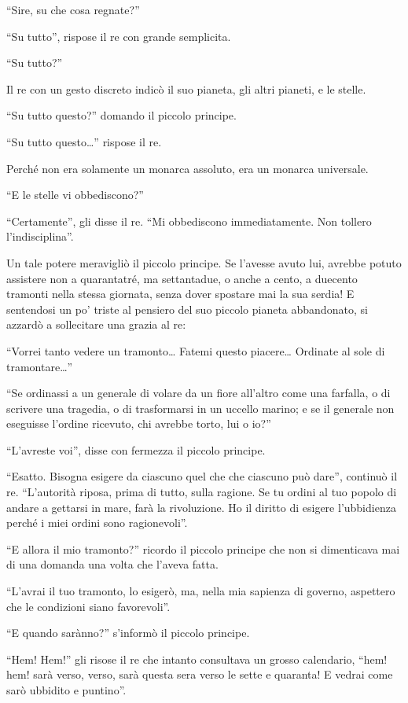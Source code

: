 \documentclass[11pt]{scrbook}
\begin{document}
``Sire, su che cosa regnate?''

``Su tutto'', rispose il re con grande semplicita.

``Su tutto?''

Il re con un gesto discreto indicò il suo pianeta, gli altri pianeti, e le stelle.

``Su tutto questo?'' domando il piccolo principe.

``Su tutto questo\ldots{}'' rispose il re.

Perché non era solamente un monarca assoluto, era un monarca universale.

``E le stelle vi obbediscono?''

``Certamente'', gli disse il re. ``Mi obbediscono immediatamente. Non tollero l'indisciplina''.

Un tale potere meravigliò il piccolo principe. Se l'avesse avuto lui, avrebbe potuto assistere non a quarantatré, ma settantadue, o anche a cento, a duecento tramonti nella stessa giornata, senza dover spostare mai la sua serdia! E sentendosi un po' triste al pensiero del suo piccolo pianeta abbandonato, si azzardò a sollecitare una grazia al re:

``Vorrei tanto vedere un tramonto\ldots{} Fatemi questo piacere\ldots{} Ordinate al sole di tramontare\ldots{}''

``Se ordinassi a un generale di volare da un fiore all'altro come una farfalla, o di scrivere una tragedia, o di trasformarsi in un uccello marino; e se il generale non eseguisse l'ordine ricevuto, chi avrebbe torto, lui o io?''

``L'avreste voi'', disse con fermezza il piccolo principe.

``Esatto. Bisogna esigere da ciascuno quel che che ciascuno può dare'', continuò il re. ``L'autorità riposa, prima di tutto, sulla ragione. Se tu ordini al tuo popolo di andare a gettarsi in mare, farà la rivoluzione. Ho il diritto di esigere l'ubbidienza perché i miei ordini sono ragionevoli''.

``E allora il mio tramonto?'' ricordo il piccolo principe che non si dimenticava mai di una domanda una volta che l'aveva fatta.

``L'avrai il tuo tramonto, lo esigerò, ma, nella mia sapienza di governo, aspettero che le condizioni siano favorevoli''.

``E quando sarànno?'' s'informò il piccolo principe.

``Hem! Hem!'' gli risose il re che intanto consultava un grosso calendario, ``hem! hem! sarà verso, verso, sarà questa sera verso le sette e quaranta! E vedrai come sarò ubbidito e puntino''.
\end{document}
